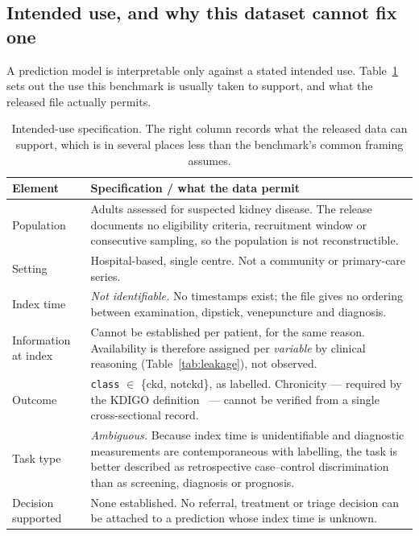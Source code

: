 \documentclass[conference]{IEEEtran}
\newcommand{\tabhead}[1]{\textbf{#1}}
\begin{document}
\subsection{Intended use, and why this dataset cannot fix one}
\label{sec:intendeduse}

A prediction model is interpretable only against a stated intended use.
Table~\ref{tab:intendeduse} sets out the use this benchmark is usually taken
to support, and what the released file actually permits.

\begin{table}[t]
\caption{Intended-use specification. The right column records what the
released data can support, which is in several places less than the
benchmark's common framing assumes.}
\label{tab:intendeduse}
\centering
\footnotesize
\setlength{\tabcolsep}{3pt}
\begin{tabular}{p{2.35cm}p{5.5cm}}
\toprule
\tabhead{Element} & \tabhead{Specification / what the data permit} \\
\midrule
Population & Adults assessed for suspected kidney disease. The release
documents no eligibility criteria, recruitment window or consecutive
sampling, so the population is not reconstructible. \\
Setting & Hospital-based, single centre. Not a community or primary-care
series. \\
Index time & \emph{Not identifiable.} No timestamps exist; the file gives no
ordering between examination, dipstick, venepuncture and diagnosis. \\
Information at index & Cannot be established per patient, for the same
reason. Availability is therefore assigned per \emph{variable} by clinical
reasoning (Table~\ref{tab:leakage}), not observed. \\
Outcome & \texttt{class} $\in$ \{ckd, notckd\}, as labelled. Chronicity ---
required by the KDIGO definition~\cite{kdigo2024} --- cannot be verified
from a single cross-sectional record. \\
Task type & \emph{Ambiguous.} Because index time is unidentifiable and
diagnostic measurements are contemporaneous with labelling, the task is
better described as retrospective case--control discrimination than as
screening, diagnosis or prognosis. \\
Decision supported & None established. No referral, treatment or triage
decision can be attached to a prediction whose index time is unknown. \\
\bottomrule
\end{tabular}
\end{table}
\end{document}
